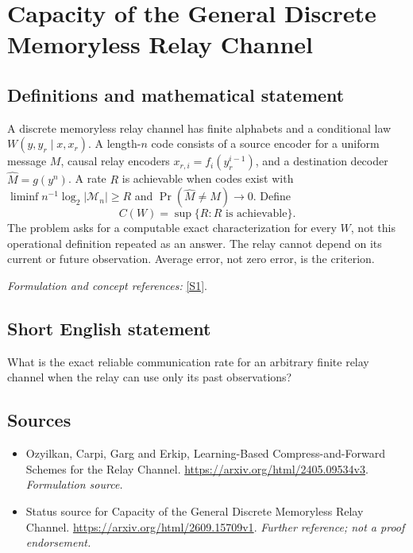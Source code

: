 \documentclass[11pt]{article}
\begin{document}
\section*{\texorpdfstring{Capacity of the General Discrete Memoryless Relay Channel}{Capacity of the General Discrete Memoryless Relay Channel}}\label{statement}
\subsection{Definitions and mathematical statement}
A discrete memoryless relay channel has finite alphabets and a conditional law $W(y,y_r\mid x,x_r)$. A length-$n$ code consists of a source encoder for a uniform message $M$, causal relay encoders $x_{r,i}=f_i(y_r^{i-1})$, and a destination decoder $\widehat M=g(y^n)$. A rate $R$ is achievable when codes exist with $\liminf n^{-1}\log_2|\mathcal M_n|\ge R$ and $\Pr(\widehat M\ne M)\to0$. Define
\[
 C(W)=\sup\{R:R\text{ is achievable}
 \}.
\]
The problem asks for a computable exact characterization for every $W$, not this operational definition repeated as an answer. The relay cannot depend on its current or future observation. Average error, not zero error, is the criterion.
\par\smallskip\textit{Formulation and concept references:} \href{https://arxiv.org/html/2405.09534v3}{[S1]}.

\subsection{Short English statement}
What is the exact reliable communication rate for an arbitrary finite relay channel when the relay can use only its past observations?
\subsection{Sources}
\begin{itemize}
\item[S1]Ozyilkan, Carpi, Garg and Erkip, Learning-Based Compress-and-Forward Schemes for the Relay Channel.
\url{https://arxiv.org/html/2405.09534v3}.
\textit{Formulation source.}
\item[S2]Status source for Capacity of the General Discrete Memoryless Relay Channel.
\url{https://arxiv.org/html/2609.15709v1}.
\textit{Further reference; not a proof endorsement.}
\end{itemize}
\end{document}
